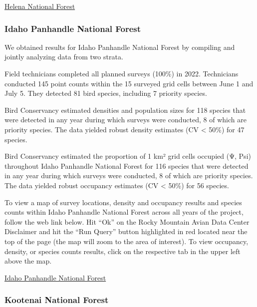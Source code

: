 \documentclass[
  letterpaper,
  DIV=11,
  numbers=noendperiod,
  oneside]{scrreprt}
\begin{document}
\href{http://www.rmbo.org/new_site/adc/QueryWindow.aspx\#N4IgzgrgDgpgTmALnAhoiBbEAuABCACRgBsYA7FXAOTQEsB7C43AMXrhiRAF8g==}{Helena
National Forest}

\hypertarget{idaho-panhandle-national-forest}{%
\subsubsection{Idaho Panhandle National
Forest}\label{idaho-panhandle-national-forest}}

We obtained results for Idaho Panhandle National Forest by compiling and
jointly analyzing data from two strata.

Field technicians completed all planned surveys (100\%) in 2022.
Technicians conducted 145 point counts within the 15 surveyed grid cells
between June 1 and July 5. They detected 81 bird species, including 7
priority species.

Bird Conservancy estimated densities and population sizes for 118
species that were detected in any year during which surveys were
conducted, 8 of which are priority species. The data yielded robust
density estimates (CV \textless{} 50\%) for 47 species.

Bird Conservancy estimated the proportion of 1 km² grid cells occupied
(Ψ, Psi) throughout Idaho Panhandle National Forest for 116 species that
were detected in any year during which surveys were conducted, 8 of
which are priority species. The data yielded robust occupancy estimates
(CV \textless{} 50\%) for 56 species.

To view a map of survey locations, density and occupancy results and
species counts within Idaho Panhandle National Forest across all years
of the project, follow the web link below. Hit ``Ok'' on the Rocky
Mountain Avian Data Center Disclaimer and hit the ``Run Query'' button
highlighted in red located near the top of the page (the map will zoom
to the area of interest). To view occupancy, density, or species counts
results, click on the respective tab in the upper left above the map.

\href{http://www.rmbo.org/new_site/adc/QueryWindow.aspx\#N4IgzgrgDgpgTmALnAhoiBbEAuABCASQBMUALAe1wAUUA7UuogGxlwDk0BLc2lJ3AGLk4MJCAC+QA===}{Idaho
Panhandle National Forest}

\hypertarget{kootenai-national-forest}{%
\subsubsection{Kootenai National
Forest}\label{kootenai-national-forest}}
\end{document}
